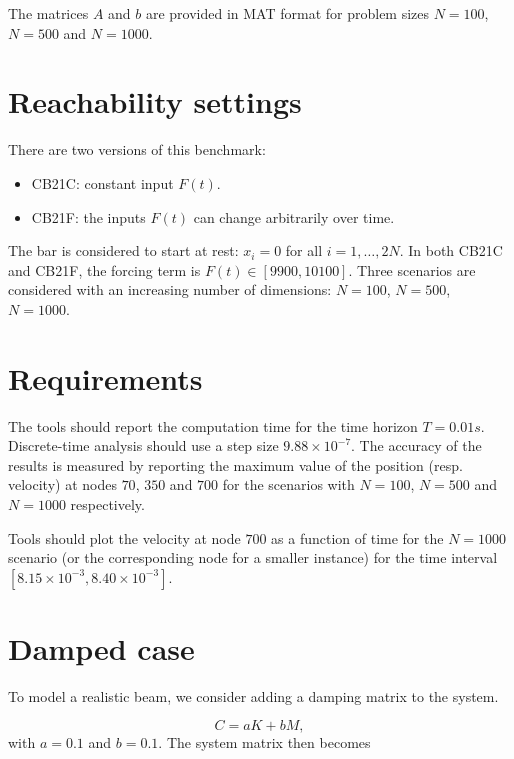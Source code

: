 \documentclass{article}
\begin{document}
The matrices $A$ and $b$ are provided in MAT format for problem sizes $N=100$, $N=500$ and $N=1000$.

\section{Reachability settings}

There are two versions of this benchmark:

\begin{itemize}
    \item CB21C: constant input $F(t)$.
 
     \item CB21F: the inputs $F(t)$ can change arbitrarily over time.
\end{itemize}

The bar is considered to start at rest: $x_i = 0$ for all $i = 1, \ldots, 2N$. In both CB21C and CB21F, the forcing term is $F(t) \in [9900, 10100]$. Three scenarios are considered with an increasing number of dimensions: $N = 100$, $N=500$, $N=1000$.

\section{Requirements}

The tools should report the computation time for the time horizon $T = 0.01s$. Discrete-time analysis should use a step size $9.88\times 10^{-7}$. The accuracy of the results is measured by reporting the maximum value of the position (resp. velocity) at nodes $70$, $350$ and $700$ for the scenarios with $N = 100$, $N=500$ and $N = 1000$ respectively.

Tools should plot the velocity at node $700$ as a function of time for the $N = 1000$ scenario (or the corresponding node for a smaller instance) for the time interval $[8.15\times 10^{-3}, 8.40\times 10^{-3}]$.


\section{Damped case}

To model a realistic beam, we consider adding a damping matrix to the system.

\begin{equation}
	C = aK + bM,
\end{equation}
with $a = 0.1$ and $b = 0.1$. The system matrix then becomes
\end{document}
